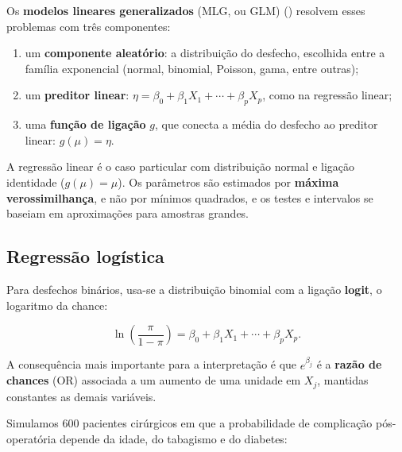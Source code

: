 \documentclass[
]{book}
\providecommand{\tightlist}{%
  \setlength{\itemsep}{0pt}\setlength{\parskip}{0pt}}
\begin{document}
Os \textbf{modelos lineares generalizados} (MLG, ou GLM) () resolvem esses problemas com três componentes:

\begin{enumerate}
\def\labelenumi{\arabic{enumi}.}
\tightlist
\item
  um \textbf{componente aleatório}: a distribuição do desfecho, escolhida entre a família exponencial (normal, binomial, Poisson, gama, entre outras);
\item
  um \textbf{preditor linear}: \(\eta = \beta_0 + \beta_1 X_1 + \cdots + \beta_p X_p\), como na regressão linear;
\item
  uma \textbf{função de ligação} \(g\), que conecta a média do desfecho ao preditor linear: \(g(\mu) = \eta\).
\end{enumerate}

A regressão linear é o caso particular com distribuição normal e ligação identidade (\(g(\mu) = \mu\)). Os parâmetros são estimados por \textbf{máxima verossimilhança}, e não por mínimos quadrados, e os testes e intervalos se baseiam em aproximações para amostras grandes.

\subsection{Regressão logística}\label{regressuxe3o-loguxedstica}

Para desfechos binários, usa-se a distribuição binomial com a ligação \textbf{logit}, o logaritmo da chance:

\[
\ln\left(\frac{\pi}{1 - \pi}\right) = \beta_0 + \beta_1 X_1 + \cdots + \beta_p X_p .
\]

A consequência mais importante para a interpretação é que \(e^{\beta_j}\) é a \textbf{razão de chances} (OR) associada a um aumento de uma unidade em \(X_j\), mantidas constantes as demais variáveis.

Simulamos 600 pacientes cirúrgicos em que a probabilidade de complicação pós-operatória depende da idade, do tabagismo e do diabetes:
\end{document}
